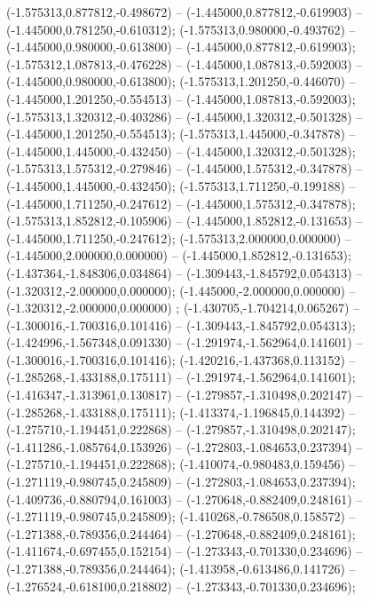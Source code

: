  (-1.575313,0.877812,-0.498672) -- (-1.445000,0.877812,-0.619903) -- (-1.445000,0.781250,-0.610312);
 (-1.575313,0.980000,-0.493762) -- (-1.445000,0.980000,-0.613800) -- (-1.445000,0.877812,-0.619903);
 (-1.575312,1.087813,-0.476228) -- (-1.445000,1.087813,-0.592003) -- (-1.445000,0.980000,-0.613800);
 (-1.575313,1.201250,-0.446070) -- (-1.445000,1.201250,-0.554513) -- (-1.445000,1.087813,-0.592003);
 (-1.575313,1.320312,-0.403286) -- (-1.445000,1.320312,-0.501328) -- (-1.445000,1.201250,-0.554513);
 (-1.575313,1.445000,-0.347878) -- (-1.445000,1.445000,-0.432450) -- (-1.445000,1.320312,-0.501328);
 (-1.575313,1.575312,-0.279846) -- (-1.445000,1.575312,-0.347878) -- (-1.445000,1.445000,-0.432450);
 (-1.575313,1.711250,-0.199188) -- (-1.445000,1.711250,-0.247612) -- (-1.445000,1.575312,-0.347878);
 (-1.575313,1.852812,-0.105906) -- (-1.445000,1.852812,-0.131653) -- (-1.445000,1.711250,-0.247612);
 (-1.575313,2.000000,0.000000) -- (-1.445000,2.000000,0.000000) -- (-1.445000,1.852812,-0.131653);
 (-1.437364,-1.848306,0.034864) -- (-1.309443,-1.845792,0.054313) -- (-1.320312,-2.000000,0.000000);
 (-1.445000,-2.000000,0.000000) -- (-1.320312,-2.000000,0.000000) ;
 (-1.430705,-1.704214,0.065267) -- (-1.300016,-1.700316,0.101416) -- (-1.309443,-1.845792,0.054313);
 (-1.424996,-1.567348,0.091330) -- (-1.291974,-1.562964,0.141601) -- (-1.300016,-1.700316,0.101416);
 (-1.420216,-1.437368,0.113152) -- (-1.285268,-1.433188,0.175111) -- (-1.291974,-1.562964,0.141601);
 (-1.416347,-1.313961,0.130817) -- (-1.279857,-1.310498,0.202147) -- (-1.285268,-1.433188,0.175111);
 (-1.413374,-1.196845,0.144392) -- (-1.275710,-1.194451,0.222868) -- (-1.279857,-1.310498,0.202147);
 (-1.411286,-1.085764,0.153926) -- (-1.272803,-1.084653,0.237394) -- (-1.275710,-1.194451,0.222868);
 (-1.410074,-0.980483,0.159456) -- (-1.271119,-0.980745,0.245809) -- (-1.272803,-1.084653,0.237394);
 (-1.409736,-0.880794,0.161003) -- (-1.270648,-0.882409,0.248161) -- (-1.271119,-0.980745,0.245809);
 (-1.410268,-0.786508,0.158572) -- (-1.271388,-0.789356,0.244464) -- (-1.270648,-0.882409,0.248161);
 (-1.411674,-0.697455,0.152154) -- (-1.273343,-0.701330,0.234696) -- (-1.271388,-0.789356,0.244464);
 (-1.413958,-0.613486,0.141726) -- (-1.276524,-0.618100,0.218802) -- (-1.273343,-0.701330,0.234696);
